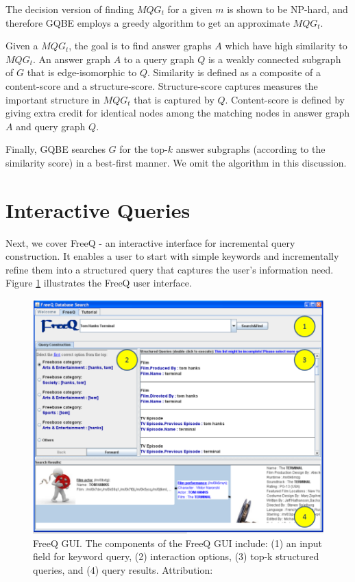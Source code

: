 \documentclass[a4paper, twoside, 12pt]{report}
\begin{document}
 The decision version of finding $MQG_t$ for a given $m$ is shown to be NP-hard, and therefore GQBE employs a greedy algorithm to get an approximate $MQG_t$.
 
 Given a $MQG_t$, the goal is to find answer graphs $A$ which have high similarity to $MQG_t$. An answer graph $A$ to a query graph $Q$ is a
 weakly connected subgraph of $G$ that is edge-isomorphic to $Q$. Similarity is defined as a composite of a content-score and a structure-score. Structure-score captures measures the important structure in $MQG_t$ that is captured by $Q$. Content-score is defined by giving extra credit for identical nodes among the matching nodes in answer graph $A$ and query graph $Q$.
 
 Finally, GQBE searches $G$ for the top-$k$ answer subgraphs (according to the similarity score) in a best-first manner. We omit the algorithm in this discussion. 
 
 \section{Interactive Queries}
 
 Next, we cover FreeQ \cite{demidova2012freeq} - an interactive interface for incremental query construction. It enables a user to start with simple keywords and incrementally refine them into a structured query that captures the user's information need. Figure \ref{fig:freeq} illustrates the FreeQ user interface.

 \begin{figure}[h!]
 \includegraphics[scale=0.45]{freeq.png}
 \caption{FreeQ GUI. The components of the FreeQ
GUI include: (1) an input field for keyword query,
(2) interaction options, (3) top-k structured queries,
and (4) query results. Attribution: \cite{demidova2012freeq}}
 \label{fig:freeq}
 \end{figure}
 
\end{document}
